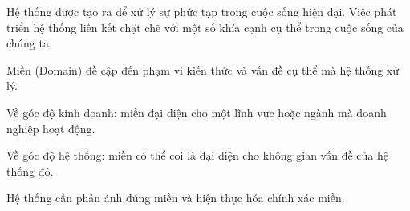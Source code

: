 Hệ thống được tạo ra để xử lý sự phức tạp trong cuộc sống hiện đại. Việc phát triển hệ thống liên kết chặt chẽ với một số khía cạnh cụ thể trong cuộc sống của chúng ta.

Miền (Domain) đề cập đến phạm vi kiến thức và vấn đề cụ thể mà hệ thống   xử lý.

Về góc độ kinh doanh: miền đại diện cho một lĩnh vực hoặc ngành mà doanh nghiệp hoạt động.

Về góc độ hệ thống: miền có thể coi là đại diện cho không gian vấn đề của hệ thống đó.

Hệ thống cần phản ánh đúng miền và hiện thực hóa chính xác miền.



